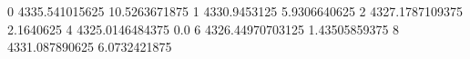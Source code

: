 0 4335.541015625 10.5263671875
1 4330.9453125 5.9306640625
2 4327.1787109375 2.1640625
4 4325.0146484375 0.0
6 4326.44970703125 1.43505859375
8 4331.087890625 6.0732421875
